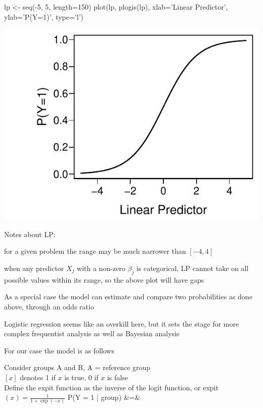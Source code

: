 \begin{Schunk}
\begin{Sinput}
lp <- seq(-5, 5, length=150)
plot(lp, plogis(lp), xlab='Linear Predictor', ylab='P(Y=1)', type='l')
\end{Sinput}


\centerline{\includegraphics[width=\maxwidth]{prop-lrmshape-1} }

\end{Schunk}
\item Notes about LP:
 \bi 
 \item for a given problem the range may be much narrower than $[-4,4]$
 \item when any predictor $X_j$ with a non-zero $\beta_j$ is categorical, LP cannot take on all possible values within its range, so the above plot will have gaps
 \ei
\item As a special case the model can estimate and compare two probabilities as done above, through an odds ratio
\item Logistic regression seems like an overkill here, but it sets the stage for more complex frequentist analysis as well as Bayesian analysis
\item For our case the model is as follows
\item Consider groups A and B, A = reference group\\
  $[x]$ denotes 1 if $x$ is true, 0 if $x$ is false\\
  Define the expit function as the inverse of the logit function, or expit$(x) = \frac{1}{1 + \exp(-x)}$
\beqa
P(Y = 1 | \textrm{group}) &=&  \\
